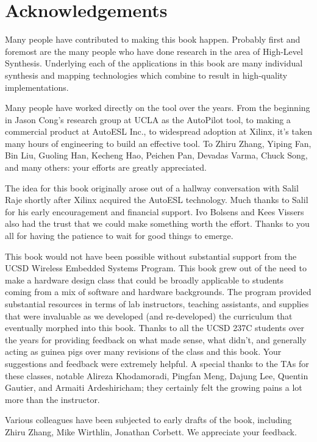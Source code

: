 
\chapter*{Acknowledgements}

Many people have contributed to making this book happen.  Probably first and foremost are the many people who have done research in the area of High-Level Synthesis.  Underlying each of the applications in this book are many individual synthesis and mapping technologies which combine to result in high-quality implementations.

Many people have worked directly on the \VHLS tool over the years.  From the beginning in Jason Cong's research group at UCLA as the AutoPilot tool, to making a commercial product at AutoESL Inc., to widespread adoption at Xilinx, it's taken many hours of engineering to build an effective tool.  To Zhiru Zhang, Yiping Fan, Bin Liu, Guoling Han, Kecheng Hao, Peichen Pan, Devadas Varma, Chuck Song, and many others: your efforts are greatly appreciated.

The idea for this book originally arose out of a hallway conversation with Salil Raje shortly after Xilinx acquired the AutoESL technology.  Much thanks to Salil for his early encouragement and financial support.  Ivo Bolsens and Kees Vissers also had the trust that we could make something worth the effort.  Thanks to you all for having the patience to wait for good things to emerge.

This book would not have been possible without substantial support from the UCSD Wireless Embedded Systems Program. This book grew out of the need to make a hardware design class that could be broadly applicable to students coming from a mix of software and hardware backgrounds.  The program provided substantial resources in terms of lab instructors, teaching assistants, and supplies that were invaluable as we developed (and re-developed) the curriculum that eventually morphed into this book. Thanks to all the UCSD 237C students over the years for providing feedback on what made sense, what didn't, and generally acting as guinea pigs over many revisions of the class and this book. Your suggestions and feedback were extremely helpful. A special thanks to the TAs for these classes, notable Alireza Khodamoradi, Pingfan Meng, Dajung Lee, Quentin Gautier, and Armaiti Ardeshiricham; they certainly felt the growing pains a lot more than the instructor.

Various colleagues have been subjected to early drafts of the book, including Zhiru Zhang, Mike Wirthlin, Jonathan Corbett. We appreciate your feedback.  